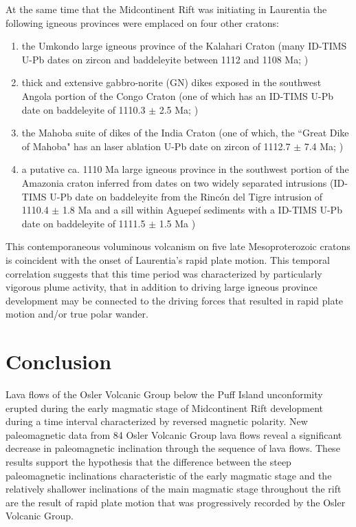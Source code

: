 \documentclass[draft,gc]{AGUTeX}
\begin{document}
\begin{article}
At the same time that the Midcontinent Rift was initiating in Laurentia the following igneous provinces were emplaced on four other cratons:
\begin{enumerate}
\item the Umkondo large igneous province of the Kalahari Craton (many ID-TIMS U-Pb dates on zircon and baddeleyite between 1112 and 1108 Ma; \cite{Hanson2004a})
\item  thick and extensive gabbro-norite (GN) dikes exposed in the southwest Angola portion of the Congo Craton (one of which has an ID-TIMS U-Pb date on baddeleyite of 1110.3 $\pm$ 2.5 Ma; \cite{Ernst2013a})
\item the Mahoba suite of dikes of the India Craton (one of which, the ``Great Dike of Mahoba" has an laser ablation U-Pb date on zircon of 1112.7 $\pm$ 7.4 Ma; \cite{Pradhan2012a})
\item a putative ca. 1110 Ma large igneous province in the southwest portion of the Amazonia craton inferred from dates on two widely separated intrusions (ID-TIMS U-Pb date on baddeleyite from the Rinc\'on del Tigre intrusion of 1110.4 $\pm$ 1.8 Ma and a sill within Aguepe\'i sediments with a ID-TIMS U-Pb date on baddeleyite of 1111.5 $\pm$ 1.5 Ma \cite{Hamilton2012a})
\end{enumerate}

This contemporaneous voluminous volcanism on five late Mesoproterozoic cratons is coincident with the onset of Laurentia's rapid plate motion. This temporal correlation suggests that this time period was characterized by particularly vigorous plume activity, that in addition to driving large igneous province development may be connected to the driving forces that resulted in rapid plate motion and/or true polar wander.

\section{Conclusion}

Lava flows of the Osler Volcanic Group below the Puff Island unconformity erupted during the early magmatic stage of Midcontinent Rift development during a time interval characterized by reversed magnetic polarity. New paleomagnetic data from 84 Osler Volcanic Group lava flows reveal a significant decrease in paleomagnetic inclination through the sequence of lava flows. These results support the hypothesis that the difference between the steep paleomagnetic inclinations characteristic of the early magmatic stage and the relatively shallower inclinations of the main magmatic stage throughout the rift are the result of rapid plate motion that was progressively recorded by the Osler Volcanic Group.


\end{article}
\end{document}
